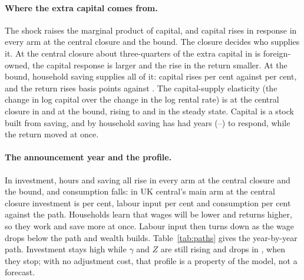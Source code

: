 \paragraph{Where the extra capital comes from.} The shock raises the marginal product of capital, and capital rises in response in every arm at the central closure and the bound. The closure decides who supplies it. At the central closure about three-quarters of the extra capital in \genHeadYear{} is foreign-owned, the capital response is larger and the rise in the return smaller. At the bound, household saving supplies all of it: capital rises \genUkCentralMainCapitalBoundAbs{} per cent against \genUkCentralMainCapitalCentralAbs{} per cent, and the return rises \genUkCentralMainInterestBpBoundAbs{} basis points against \genUkCentralMainInterestBpCentralAbs{}. The capital-supply elasticity (the change in log capital over the change in the log rental rate) is \genUkCentralElasticityCentral{} at the central closure in \genHeadYear{} and \genUkCentralElasticityBound{} at the bound, rising to \genUkCentralElasticitySsCentral{} and \genUkCentralElasticitySsBound{} in the steady state. Capital is a stock built from saving, and by \genHeadYear{} household saving has had \genYearsShockToHead{} years (\genShockYear--\genYearTwoAfterShock{}) to respond, while the return moved at once.

\paragraph{The announcement year and the profile.} In \genShockYear{} investment, hours and saving all rise in every arm at the central closure and the bound, and consumption falls: in UK central's main arm at the central closure investment is \genUkCentralMainInvestmentTwentyEightCentral{} per cent, labour input \genUkCentralMainLabourTwentyEightCentral{} per cent and consumption \genUkCentralMainConsumptionTwentyEightCentral{} per cent against the path. Households learn that wages will be lower and returns higher, so they work and save more at once. Labour input then turns down as the wage drops below the path and wealth builds. Table~\ref{tab:paths} gives the year-by-year path. Investment stays high while $\gamma$ and $Z$ are still rising and drops in \genHeadYear{}, when they stop; with no adjustment cost, that profile is a property of the model, not a forecast.

